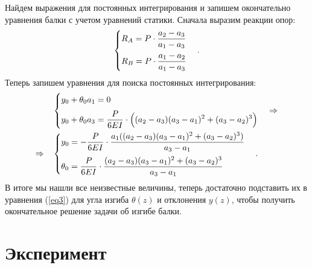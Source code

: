 \documentclass[12pt, a4paper]{article}
\begin{document}
    Найдем выражения для постоянных интегрирования и запишем окончательно уравнения балки с учетом уравнений статики. Сначала выразим реакции опор:
    \begin{equation}
        \begin{cases}
            \displaystyle R_{A} = P \cdot \frac{a_{2} - a_{3}}{a_{1} - a_{3}} \vspace{0.2cm} \\
            \displaystyle R_{B} = P \cdot \frac{a_{1} - a_{2}}{a_{1} - a_{3}} \\
        \end{cases}.
        \label{eq6}
    \end{equation}
    Теперь запишем уравнения для поиска постоянных интегрирования:
    \begin{equation}
        \begin{aligned}
        &\begin{cases}
            \displaystyle y_{0} + \theta_{0} a_{1} = 0 \vspace{0.2cm} \\
            \displaystyle y_{0} + \theta_{0} a_{3} = \frac{P}{6EI} \cdot \Big( (a_{2} - a_{3})(a_{3} - a_{1})^{2} + (a_{3} - a_{2})^{3} \Big)\\
        \end{cases} \Rightarrow \\
        \Rightarrow \quad
        &\begin{cases}
            \displaystyle y_{0} = - \frac{P}{6EI} \cdot \frac{a_{1}((a_{2} - a_{3})(a_{3} - a_{1})^{2} + (a_{3} - a_{2})^{3})}{a_{3} - a_{1}} \vspace{0.2cm} \\
            \displaystyle \theta_{0} = \frac{P}{6EI} \cdot \frac{(a_{2} - a_{3})(a_{3} - a_{1})^{2} + (a_{3} - a_{2})^{3}}{a_{3} - a_{1}} \\
        \end{cases}.
        \end{aligned}
        \label{eq7}
    \end{equation}
    В итоге мы нашли все неизвестные величины, теперь достаточно подставить их в уравнения (\ref{eq3}) для угла изгиба $\theta(z)$ и отклонения $y(z)$, чтобы получить окончательное решение задачи об изгибе балки.
    
    \newpage
    
    \section{Эксперимент}
    
\end{document}
